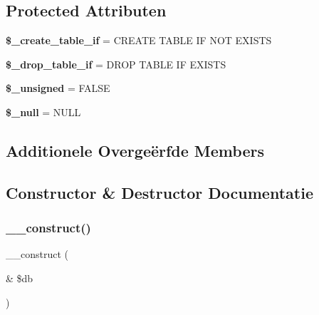\subsection*{Protected Attributen}
\begin{DoxyCompactItemize}
\item 
\mbox{\label{class_c_i___d_b__pdo__sqlite__forge_a2f6484fcb8d1dc3eef67a637227cd583}} 
{\bfseries \$\+\_\+create\+\_\+table\+\_\+if} = \textquotesingle{}C\+R\+E\+A\+TE T\+A\+B\+LE IF N\+OT E\+X\+I\+S\+TS\textquotesingle{}
\item 
\mbox{\label{class_c_i___d_b__pdo__sqlite__forge_a92a8a9145a7fc91e252e58d019373581}} 
{\bfseries \$\+\_\+drop\+\_\+table\+\_\+if} = \textquotesingle{}D\+R\+OP T\+A\+B\+LE IF E\+X\+I\+S\+TS\textquotesingle{}
\item 
\mbox{\label{class_c_i___d_b__pdo__sqlite__forge_aae977ae6d61fa183f0b25422b6ddc31c}} 
{\bfseries \$\+\_\+unsigned} = F\+A\+L\+SE
\item 
\mbox{\label{class_c_i___d_b__pdo__sqlite__forge_ae58fe6a5104d4a069a49b27533ce808f}} 
{\bfseries \$\+\_\+null} = \textquotesingle{}N\+U\+LL\textquotesingle{}
\end{DoxyCompactItemize}
\subsection*{Additionele Overge\"{e}rfde Members}


\subsection{Constructor \& Destructor Documentatie}
\mbox{\label{class_c_i___d_b__pdo__sqlite__forge_aaf2ef772755ec6f361d44e16cc9ffd69}} 
\subsubsection{\texorpdfstring{\_\_construct()}{\_\_construct()}}
{\footnotesize\ttfamily \+\_\+\+\_\+construct (\begin{DoxyParamCaption}\item[{\&}]{\$db }\end{DoxyParamCaption})}


